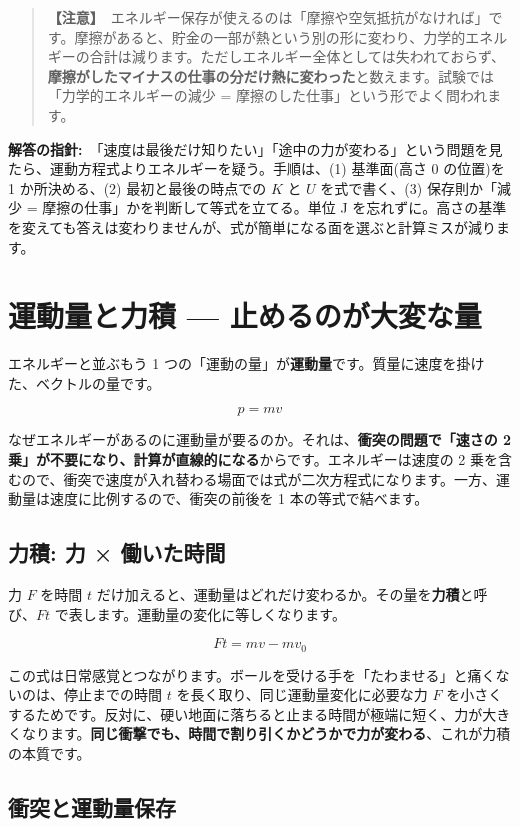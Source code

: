 \documentclass{article}
\begin{document}
\begin{quote}
\textbf{【注意】}\ エネルギー保存が使えるのは「摩擦や空気抵抗がなければ」です。摩擦があると、貯金の一部が熱という別の形に変わり、力学的エネルギーの合計は減ります。ただしエネルギー全体としては失われておらず、\textbf{摩擦がしたマイナスの仕事の分だけ熱に変わった}と数えます。試験では「力学的エネルギーの減少 = 摩擦のした仕事」という形でよく問われます。
\end{quote}

\textbf{解答の指針:}\ 「速度は最後だけ知りたい」「途中の力が変わる」という問題を見たら、運動方程式よりエネルギーを疑う。手順は、(1) 基準面(高さ 0 の位置)を 1 か所決める、(2) 最初と最後の時点での \( K \) と \( U \) を式で書く、(3) 保存則か「減少 = 摩擦の仕事」かを判断して等式を立てる。単位 J を忘れずに。高さの基準を変えても答えは変わりませんが、式が簡単になる面を選ぶと計算ミスが減ります。

\section{運動量と力積 — 止めるのが大変な量}

エネルギーと並ぶもう 1 つの「運動の量」が\textbf{運動量}です。質量に速度を掛けた、ベクトルの量です。

\[ p = mv \]

なぜエネルギーがあるのに運動量が要るのか。それは、\textbf{衝突の問題で「速さの 2 乗」が不要になり、計算が直線的になる}からです。エネルギーは速度の 2 乗を含むので、衝突で速度が入れ替わる場面では式が二次方程式になります。一方、運動量は速度に比例するので、衝突の前後を 1 本の等式で結べます。

\subsection{力積: 力 × 働いた時間}

力 \( F \) を時間 \( t \) だけ加えると、運動量はどれだけ変わるか。その量を\textbf{力積}と呼び、\( Ft \) で表します。運動量の変化に等しくなります。

\[ Ft = mv - mv_{0} \]

この式は日常感覚とつながります。ボールを受ける手を「たわませる」と痛くないのは、停止までの時間 \( t \) を長く取り、同じ運動量変化に必要な力 \( F \) を小さくするためです。反対に、硬い地面に落ちると止まる時間が極端に短く、力が大きくなります。\textbf{同じ衝撃でも、時間で割り引くかどうかで力が変わる}、これが力積の本質です。

\subsection{衝突と運動量保存}
\end{document}
